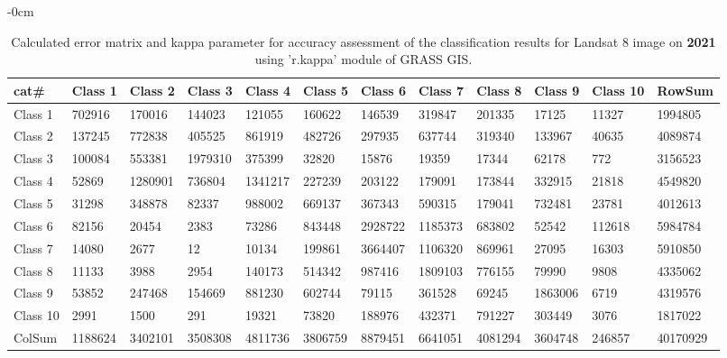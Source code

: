 \documentclass[analytics,article,submit,pdftex,moreauthors]{Definitions/mdpi}
\begin{document}
\begin{table}[H] 
\footnotesize
    \centering
    \begin{adjustwidth}{-\extralength}{0cm}
    \caption{Calculated error matrix and kappa parameter for accuracy assessment of the classification results for Landsat 8 image on \textbf{2021} using 'r.kappa' module of GRASS GIS.\label{tab03}}
 	\begin{tabularx}{\fulllength}{|l|l|l|l|l|l|l|l|l|l|l|l|}
    \toprule
                \textbf{cat\#} & \textbf{Class 1} & \textbf{Class 2} & \textbf{Class 3} & \textbf{Class 4} & \textbf{Class 5} & \textbf{Class 6} & \textbf{Class 7} & \textbf{Class 8} & \textbf{Class 9} & \textbf{Class 10} & \textbf{RowSum} \\ \hline
        Class 1 & \cellcolor{green!10}702916 & 170016 & 144023 & 121055 & 160622 & 146539 & 319847 & 201335 & 17125 & 11327 & 1994805 \\ \hline
        Class 2 & 137245 & \cellcolor{green!10}772838 & 405525 & 861919 & 482726 & 297935 & 637744 & 319340 & 133967 & 40635 & 4089874 \\ \hline
        Class 3 & 100084 & 553381 & \cellcolor{green!10}1979310 & 375399 & 32820 & 15876 & 19359 & 17344 & 62178 & 772 & 3156523 \\ \hline
        Class 4 & 52869 & 1280901 & 736804 & \cellcolor{green!10}1341217 & 227239 & 203122 & 179091 & 173844 & 332915 & 21818 & 4549820 \\ \hline
        Class 5 & 31298 & 348878 & 82337 & 988002 & \cellcolor{green!10}669137 & 367343 & 590315 & 179041 & 732481 & 23781 & 4012613 \\ \hline
        Class 6 & 82156 & 20454 & 2383 & 73286 & 843448 & \cellcolor{green!10}2928722 & 1185373 & 683802 & 52542 & 112618 & 5984784 \\ \hline
        Class 7 & 14080 & 2677 & 12 & 10134 & 199861 & 3664407 & \cellcolor{green!10}1106320 & 869961 & 27095 & 16303 & 5910850 \\ \hline
        Class 8 & 11133 & 3988 & 2954 & 140173 & 514342 & 987416 & 1809103 & \cellcolor{green!10}776155 & 79990 & 9808 & 4335062 \\ \hline
        Class 9 & 53852 & 247468 & 154669 & 881230 & 602744 & 79115 & 361528 & 69245 & \cellcolor{green!10}1863006 & 6719 & 4319576 \\ \hline
        Class 10 & 2991 & 1500 & 291 & 19321 & 73820 & 188976 & 432371 & 791227 & 303449 & \cellcolor{green!10}3076 & 1817022 \\ \hline
        ColSum & 1188624 & 3402101 & 3508308 & 4811736 & 3806759 & 8879451 & 6641051 & 4081294 & 3604748 & 246857 & \cellcolor{green!10}40170929 \\ \hline        \bottomrule
    \end{tabularx}
    \end{adjustwidth}
\end{table}
\end{document}
